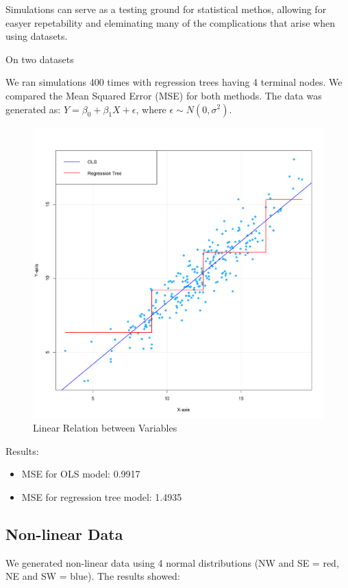 \documentclass[12pt]{article}
\begin{document}
Simulations can serve as a testing ground for statistical methos, allowing for easyer repetability and eleminating many of the complications that arise when using datasets.

On two datasets 

We ran simulations 400 times with regression trees having 4 terminal nodes. We compared the Mean Squared Error (MSE) for both methods. The data was generated as: $Y = \beta_0 + \beta_1X + \epsilon$, where $\epsilon \sim N(0, \sigma^2)$.

\begin{figure}
    \centering
    \includegraphics[scale=0.50]{OLS vs Tree.png}
    \caption{Linear Relation between Variables}
    \label{fig:sub1}  %
\end{figure}


Results:
\begin{itemize}
    \item MSE for OLS model: 0.9917 
    \item MSE for regression tree model: 1.4935 
\end{itemize}


\subsection{Non-linear Data}
We generated non-linear data using 4 normal distributions (NW and SE = red, NE and SW = blue). The results showed:
\end{document}
